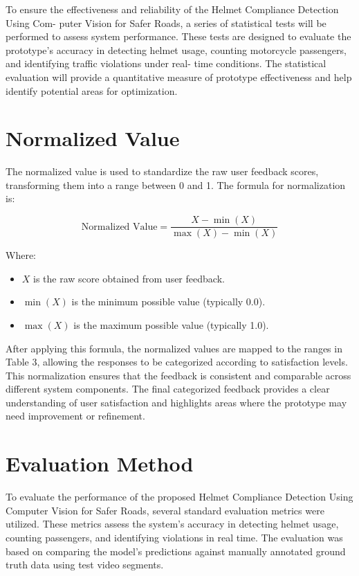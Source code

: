 \begin{refsection}
To ensure the effectiveness and reliability of the Helmet Compliance Detection Using Com- puter Vision for Safer Roads, a series of statistical tests will be performed to assess system performance. These tests are designed to evaluate the prototype’s accuracy in detecting helmet usage, counting motorcycle passengers, and identifying traffic violations under real- time conditions. The statistical evaluation will provide a quantitative measure of prototype effectiveness and help identify potential areas for optimization.


\section*{Normalized Value}
The normalized value is used to standardize the raw user feedback scores, transforming them into a range between 0 and 1. The formula for normalization is:


\begin{equation}
\text{Normalized Value} = \frac{X - \min(X)}{\max(X) - \min(X)}
\end{equation}


\noindent Where:  
\begin{itemize}
    \item $X$ is the raw score obtained from user feedback.
    \item $\min(X)$ is the minimum possible value (typically 0.0).
    \item $\max(X)$ is the maximum possible value (typically 1.0).
\end{itemize}


After applying this formula, the normalized values are mapped to the ranges in Table 3, allowing the responses to be categorized according to satisfaction levels. This normalization ensures that the feedback is consistent and comparable across different system components. The final categorized feedback provides a clear understanding of user satisfaction and highlights areas where the prototype may need improvement or refinement.


\section*{Evaluation Method}
To evaluate the performance of the proposed Helmet Compliance Detection Using Computer Vision for Safer Roads, several standard evaluation metrics were utilized. These metrics assess the system’s accuracy in detecting helmet usage, counting passengers, and identifying violations in real time. The evaluation was based on comparing the model’s predictions against manually annotated ground truth data using test video segments.



\end{refsection}
